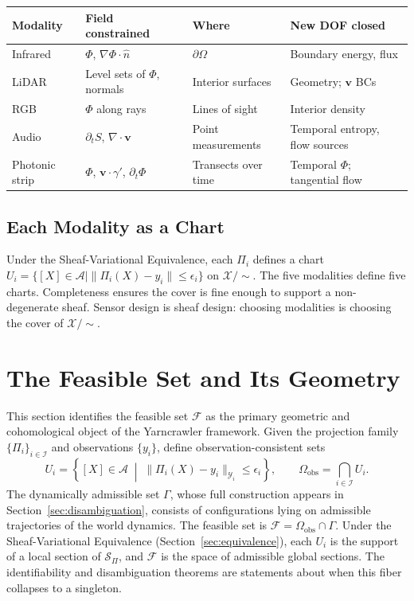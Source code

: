 \documentclass[12pt, oneside]{article}
\newcommand{\Xmod}{\mathcal{X}/{\sim}}
\begin{document}
\begin{center}
\begin{tabular}{llll}
\toprule
\textbf{Modality} & \textbf{Field constrained} & \textbf{Where} &
\textbf{New DOF closed} \\
\midrule
Infrared & $\Phi$, $\nabla\Phi \cdot \hat{n}$ & $\partial\Omega$ &
Boundary energy, flux \\
LiDAR & Level sets of $\Phi$, normals & Interior surfaces &
Geometry; $\mathbf{v}$ BCs \\
RGB & $\Phi$ along rays & Lines of sight &
Interior density \\
Audio & $\partial_t S$, $\nabla \cdot \mathbf{v}$ & Point measurements &
Temporal entropy, flow sources \\
Photonic strip & $\Phi$, $\mathbf{v} \cdot \gamma'$, $\partial_t \Phi$ &
Transects over time & Temporal $\Phi$; tangential flow \\
\bottomrule
\end{tabular}
\end{center}

\subsection{Each Modality as a Chart}

Under the Sheaf-Variational Equivalence, each $\Pi_i$ defines a chart
$U_i = \{[X] \in \mathcal{A} \mid \|\Pi_i(X) - y_i\| \le \epsilon_i\}$ on $\Xmod$.
The five modalities define five charts. Completeness ensures the cover is fine enough
to support a non-degenerate sheaf. Sensor design is sheaf design: choosing modalities
is choosing the cover of $\Xmod$.

\section{The Feasible Set and Its Geometry}
\label{sec:feasible}

This section identifies the feasible set $\mathcal{F}$ as the primary geometric and
cohomological object of the Yarncrawler framework. Given the projection family
$\{\Pi_i\}_{i \in \mathcal{I}}$ and observations $\{y_i\}$, define
observation-consistent sets
\[
U_i = \left\{ [X] \in \mathcal{A} \;\middle|\;
\|\Pi_i(X) - y_i\|_{\mathcal{Y}_i} \le \epsilon_i \right\},
\qquad
\Omega_{\mathrm{obs}} = \bigcap_{i \in \mathcal{I}} U_i.
\]
The dynamically admissible set $\Gamma$, whose full construction appears in
Section~\ref{sec:disambiguation}, consists of configurations lying on admissible
trajectories of the world dynamics. The feasible set is
$\mathcal{F} = \Omega_{\mathrm{obs}} \cap \Gamma$.
Under the Sheaf-Variational Equivalence (Section~\ref{sec:equivalence}), each $U_i$
is the support of a local section of $\mathcal{S}_\Pi$, and $\mathcal{F}$ is the space
of admissible global sections. The identifiability and disambiguation theorems are
statements about when this fiber collapses to a singleton.
\end{document}
